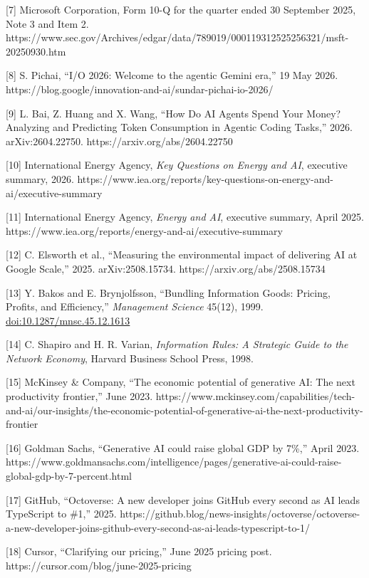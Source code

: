 \documentclass[
  10pt,
]{article}
\begin{document}
{[}7{]} Microsoft Corporation, Form 10-Q for the quarter ended 30
September 2025, Note 3 and Item 2.
https://www.sec.gov/Archives/edgar/data/789019/000119312525256321/msft-20250930.htm

{[}8{]} S. Pichai, ``I/O 2026: Welcome to the agentic Gemini era,'' 19
May 2026. https://blog.google/innovation-and-ai/sundar-pichai-io-2026/

{[}9{]} L. Bai, Z. Huang and X. Wang, ``How Do AI Agents Spend Your
Money? Analyzing and Predicting Token Consumption in Agentic Coding
Tasks,'' 2026. arXiv:2604.22750. https://arxiv.org/abs/2604.22750

{[}10{]} International Energy Agency, \emph{Key Questions on Energy and
AI}, executive summary, 2026.
https://www.iea.org/reports/key-questions-on-energy-and-ai/executive-summary

{[}11{]} International Energy Agency, \emph{Energy and AI}, executive
summary, April 2025.
https://www.iea.org/reports/energy-and-ai/executive-summary

{[}12{]} C. Elsworth et al., ``Measuring the environmental impact of
delivering AI at Google Scale,'' 2025. arXiv:2508.15734.
https://arxiv.org/abs/2508.15734

{[}13{]} Y. Bakos and E. Brynjolfsson, ``Bundling Information Goods:
Pricing, Profits, and Efficiency,'' \emph{Management Science} 45(12),
1999.
\href{https://doi.org/10.1287/mnsc.45.12.1613}{doi:10.1287/mnsc.45.12.1613}

{[}14{]} C. Shapiro and H. R. Varian, \emph{Information Rules: A
Strategic Guide to the Network Economy}, Harvard Business School Press,
1998.

{[}15{]} McKinsey \& Company, ``The economic potential of generative AI:
The next productivity frontier,'' June 2023.
https://www.mckinsey.com/capabilities/tech-and-ai/our-insights/the-economic-potential-of-generative-ai-the-next-productivity-frontier

{[}16{]} Goldman Sachs, ``Generative AI could raise global GDP by 7\%,''
April 2023.
https://www.goldmansachs.com/intelligence/pages/generative-ai-could-raise-global-gdp-by-7-percent.html

{[}17{]} GitHub, ``Octoverse: A new developer joins GitHub every second
as AI leads TypeScript to \#1,'' 2025.
https://github.blog/news-insights/octoverse/octoverse-a-new-developer-joins-github-every-second-as-ai-leads-typescript-to-1/

{[}18{]} Cursor, ``Clarifying our pricing,'' June 2025 pricing post.
https://cursor.com/blog/june-2025-pricing
\end{document}
